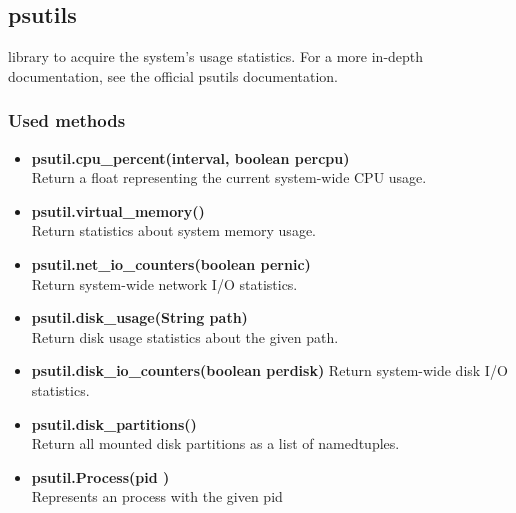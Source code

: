 \subsection{psutils}
library to acquire the system's usage statistics. For a more in-depth documentation, see the official psutils documentation.

\subsubsection{Used methods}
\begin{itemize}
	\item \textbf{psutil.cpu\_percent(interval, boolean percpu)}\\
	Return a float representing the current system-wide CPU usage.
	\item \textbf{psutil.virtual\_memory()}\\
	Return statistics about system memory usage.
	\item \textbf{psutil.net\_io\_counters(boolean pernic)}\\
	Return system-wide network I/O statistics.
	\item \textbf{psutil.disk\_usage(String path)}\\
	Return disk usage statistics about the given path.
	\item \textbf{psutil.disk\_io\_counters(boolean perdisk)}
	Return system-wide disk I/O statistics.
	\item \textbf{psutil.disk\_partitions()}\\
	Return all mounted disk partitions as a list of namedtuples.
	\item \textbf{psutil.Process(pid )}\\
	Represents an  process with the given pid
\end{itemize}


	